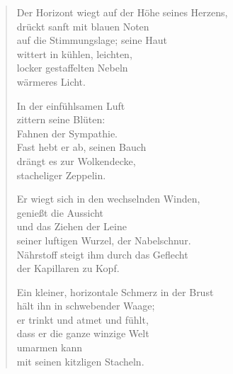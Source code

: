 
\cleartoverso


\begin{verse}

Der Horizont wiegt auf der Höhe seines Herzens,\\
drückt sanft mit blauen Noten\\
auf die Stimmungslage; seine Haut\\
wittert in kühlen, leichten,\\
locker gestaffelten Nebeln\\
wärmeres Licht.

In der einfühlsamen Luft\\
zittern seine Blüten:\\
Fahnen der Sympathie.\\
Fast hebt er ab, seinen Bauch\\
drängt es zur Wolkendecke,\\
stacheliger Zeppelin.

Er wiegt sich in den wechselnden Winden,\\
genießt die Aussicht\\
und das Ziehen der Leine\\
seiner luftigen Wurzel, der Nabelschnur.\\
Nährstoff steigt ihm durch das Geflecht\\
der Kapillaren zu Kopf.

Ein kleiner, horizontale Schmerz in der Brust\\
hält ihn in schwebender Waage;\\
er trinkt und atmet und fühlt,\\
dass er die ganze winzige Welt\\
umarmen kann\\
mit seinen kitzligen Stacheln.

\end{verse}

\clearpage


